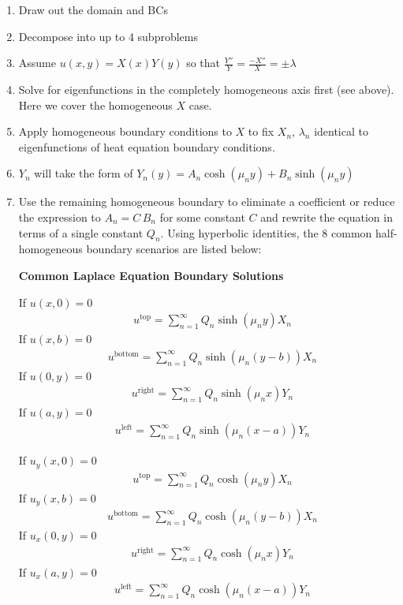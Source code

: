 \begin{enumerate}
    \item Draw out the domain and BCs
    \item Decompose into up to 4 subproblems
    \item Assume $u(x,y)=X(x)Y(y)$ so that $\frac{Y''}{Y}=\frac{-X''}{X}=\pm\lambda$
    \item Solve for eigenfunctions in the completely homogeneous axis first (see above). Here we cover the homogeneous $X$ case.
    \item Apply homogeneous boundary conditions to $X$ to fix $X_n$, $\lambda_n$ identical to eigenfunctions of heat equation boundary conditions.
    \item $Y_n$ will take the form of $Y_n(y) = A_n\cosh(\mu_n y)+B_n\sinh(\mu_ny)$
    \item Use the remaining homogeneous boundary to eliminate a coefficient or reduce the expression to $A_n=C \, B_n$ for some constant $C$ and rewrite the equation in terms of a single constant $Q_n$.  Using hyperbolic identities, the 8 common half-homogeneous boundary scenarios are listed below: 

\begin{tcolorbox}
\begin{center}
    \textbf{Common Laplace Equation Boundary Solutions}
\end{center}
\begin{multicols}{2}
If $u(x,0)=0$
\begin{align*}
    &u^{\text{top}}=\sum_{n=1}^\infty Q_n\sinh(\mu_n y)X_n
\end{align*}
If $u(x,b)=0$
\begin{align*}
    &u^{\text{bottom}}=\sum_{n=1}^\infty Q_n\sinh(\mu_n(y-b))X_n
\end{align*}
If $u(0,y)=0$
\begin{align*}
    &u^{\text{right}}=\sum_{n=1}^\infty Q_n\sinh(\mu_nx)Y_n
\end{align*}
If $u(a,y)=0$
\begin{align*}
    &u^{\text{left}}=\sum_{n=1}^\infty Q_n\sinh(\mu_n(x-a))Y_n
\end{align*}


If $u_y(x,0)=0$
\begin{align*}
    &u^{\text{top}}=\sum_{n=1}^\infty Q_n\cosh(\mu_n y)X_n
\end{align*}
If $u_y(x,b)=0$
\begin{align*}
    &u^{\text{bottom}}=\sum_{n=1}^\infty Q_n\cosh(\mu_n(y-b))X_n
\end{align*}
If $u_x(0,y)=0$
\begin{align*}
    &u^{\text{right}}=\sum_{n=1}^\infty Q_n\cosh(\mu_nx)Y_n
\end{align*}
If $u_x(a,y)=0$
\begin{align*}
    &u^{\text{left}}=\sum_{n=1}^\infty Q_n\cosh(\mu_n(x-a))Y_n
\end{align*}


\end{multicols}
\end{tcolorbox}
\end{enumerate}
